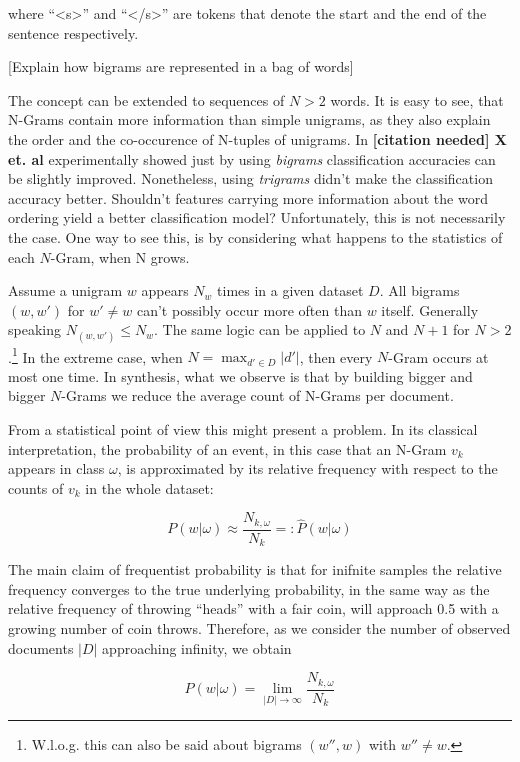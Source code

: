 where ``<s>'' and ``</s>'' are tokens that denote the start and the end of the
sentence respectively. 

[Explain how bigrams are represented in a bag of words]
 
The concept can be extended to sequences of $N > 2$ words. It is easy to see,
that N-Grams contain more information than simple unigrams, as they
also explain the order and the co-occurence of N-tuples of unigrams. In
\textbf{[citation needed] X et. al} experimentally showed just by using
\textit{bigrams} classification accuracies can be slightly improved.
Nonetheless, using \textit{trigrams} didn't make the classification accuracy better. 
Shouldn't features carrying more information about the word
ordering yield a better classification model? Unfortunately, this is not necessarily 
the case. One way to see this, is by considering what happens to the statistics
of each $N$-Gram, when N grows.
 
Assume a unigram $w$ appears $N_w$ times in a given dataset $D$. All bigrams
$(w,w')$ for $w' \neq w$ can't possibly occur more often than  $w$ itself.
Generally speaking $N_{(w,w')} \leq N_w$. 
The same logic can be applied to $N$ and $N+1$ for $N > 2$.\footnote{W.l.o.g. this can also be
said about bigrams $(w'',w)$ with $w'' \neq w$.} In the extreme case, when $N = \max_{d' \in D}
|d'|$, then every $N$-Gram occurs at most one time. In synthesis, what we observe is that by building bigger and bigger
$N$-Grams we reduce the average count of N-Grams per document.  

From a statistical point of view this might present a problem. In its classical
interpretation, the probability of an event, in this case that an 
N-Gram $v_k$ appears in class $\omega$, is approximated by
its relative frequency with respect to the counts of $v_k$ in the whole dataset: 

\begin{equation}
	P(w|\omega) \approx \frac{N_{k,\omega}}{N_k} =:
	\hat{P}(w|\omega)
\end{equation}

The main claim of frequentist probability is that for inifnite samples the
relative frequency converges to the true underlying probability, in the same 
way as the relative frequency of throwing ``heads'' with a fair coin, will
approach 0.5 with a growing number of coin throws. Therefore, as we consider the
number of observed documents $|D|$ approaching infinity, we obtain 

\begin{equation}
	P(w|\omega) = \lim_{|D| \to \infty} \frac{N_{k,\omega}}{N_k}
\end{equation}


